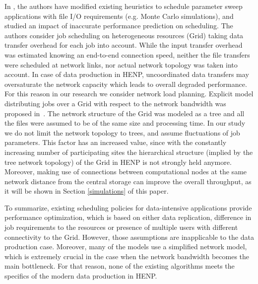 \documentclass{svjour3}                     %
\begin{document}
In \cite{XSuffarage}, the authors have modified existing heuristics  to schedule parameter sweep applications with file I/O requirements (e.g. Monte Carlo simulations), and studied an impact of inaccurate performance prediction on scheduling. The authors consider job scheduling on heterogeneous resources (Grid) taking data transfer overhead for each job into account. While the input transfer overhead was estimated knowing an end-to-end connection speed, neither the file transfers were scheduled at network links, nor actual network topology was taken into account. In case of data production in HENP, uncoordinated data transfers may oversaturate the network capacity which leads to overall degraded performance. For this reason in our research we consider network load planning.
%
Explicit model distributing jobs over a Grid with respect to the network
bandwidth was proposed in~\cite{Trees}. The network structure of the Grid was
modeled as a tree and all the files were assumed to be of the same size and
processing time. In our study we do not limit the network topology to trees,
and assume fluctuations of job parameters. This factor has an increased value, since with the constantly increasing number of participating sites the hierarchical structure (implied by the tree network topology) of the Grid in HENP is not strongly held anymore. Moreover, making use of connections between computational nodes at the same network distance from the central storage can improve the overall throughput, as it will be shown in Section \ref{simulations} of this paper.

To summarize, existing scheduling policies for data-intensive applications provide performance optimization, which is based on either data replication, difference in job requirements to the resources or presence of multiple users with different connectivity to the Grid. However, those assumptions are inapplicable to the data production case. Moreover, many of the models use a simplified network model, which is extremely crucial in the case when the network bandwidth becomes the main bottleneck. For that reason, none of the existing algorithms meets the specifics of the modern data production in HENP.
\end{document}
